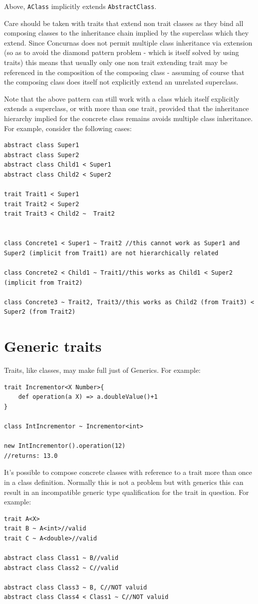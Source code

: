 \documentclass[conc-doc]{subfiles}
\begin{document}
Above, \lstinline{AClass} implicitly extends \lstinline{AbstractClass}. 

Care should be taken with traits that extend non trait classes as they bind all composing classes to the inheritance chain implied by the superclass which they extend. Since Concurnas does not permit multiple class inheritance via extension (so as to avoid the diamond pattern problem - which is itself solved by using traits) this means that usually only one non trait extending trait may be referenced in the composition of the composing class - assuming of course that the composing class does itself not explicitly extend an unrelated superclass.

Note that the above pattern can still work with a class which itself explicitly extends a superclass, or with more than one trait, provided that the inheritance hierarchy implied for the concrete class remains avoids multiple class inheritance. For example, consider the following cases:
\begin{lstlisting}
abstract class Super1
abstract class Super2
abstract class Child1 < Super1
abstract class Child2 < Super2

trait Trait1 < Super1
trait Trait2 < Super2
trait Trait3 < Child2 ~  Trait2


class Concrete1 < Super1 ~ Trait2 //this cannot work as Super1 and Super2 (implicit from Trait1) are not hierarchically related 

class Concrete2 < Child1 ~ Trait1//this works as Child1 < Super2 (implicit from Trait2)

class Concrete3 ~ Trait2, Trait3//this works as Child2 (from Trait3) < Super2 (from Trait2) 
\end{lstlisting}

\section{Generic traits}
Traits, like classes, may make full just of Generics. For example:
\begin{lstlisting}
trait Incrementor<X Number>{
	def operation(a X) => a.doubleValue()+1
}

class IntIncrementor ~ Incrementor<int>

new IntIncrementor().operation(12)
//returns: 13.0
\end{lstlisting}

It's possible to compose concrete classes with reference to a trait more than once in a class definition. Normally this is not a problem but with generics this can result in an incompatible generic type qualification for the trait in question. For example:
\begin{lstlisting}
trait A<X>
trait B ~ A<int>//valid
trait C ~ A<double>//valid

abstract class Class1 ~ B//valid
abstract class Class2 ~ C//valid

abstract class Class3 ~ B, C//NOT valuid
abstract class Class4 < Class1 ~ C//NOT valuid
\end{lstlisting}
\end{document}
